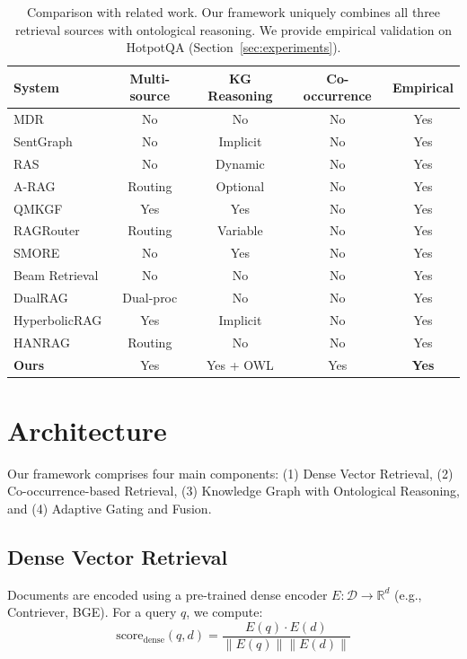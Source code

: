 \documentclass[11pt,a4paper]{article}
\begin{document}
\begin{table}[h]
\centering
\small
\begin{tabular}{lcccc}
\toprule
\textbf{System} & \textbf{Multi-source} & \textbf{KG Reasoning} & \textbf{Co-occurrence} & \textbf{Empirical} \\
\midrule
MDR & No & No & No & Yes \\
SentGraph & No & Implicit & No & Yes \\
RAS & No & Dynamic & No & Yes \\
A-RAG & Routing & Optional & No & Yes \\
QMKGF & Yes & Yes & No & Yes \\
RAGRouter & Routing & Variable & No & Yes \\
SMORE & No & Yes & No & Yes \\
Beam Retrieval & No & No & No & Yes \\
DualRAG & Dual-proc & No & No & Yes \\
HyperbolicRAG & Yes & Implicit & No & Yes \\
HANRAG & Routing & No & No & Yes \\
\midrule
\textbf{Ours} & Yes & Yes + OWL & Yes & \textbf{Yes} \\
\bottomrule
\end{tabular}
\caption{Comparison with related work. Our framework uniquely combines all three retrieval sources with ontological reasoning. We provide empirical validation on HotpotQA (Section~\ref{sec:experiments}).}
\label{tab:related_work}
\end{table}

\section{Architecture}
\label{sec:architecture}

Our framework comprises four main components: (1) Dense Vector Retrieval, (2) Co-occurrence-based Retrieval, (3) Knowledge Graph with Ontological Reasoning, and (4) Adaptive Gating and Fusion.

\subsection{Dense Vector Retrieval}
\label{sec:dense_retrieval}

Documents are encoded using a pre-trained dense encoder $E: \mathcal{D} \rightarrow \mathbb{R}^d$ (e.g., Contriever, BGE). For a query $q$, we compute:
\begin{equation}
\text{score}_{\text{dense}}(q, d) = \frac{E(q) \cdot E(d)}{\|E(q)\| \|E(d)\|}
\end{equation}
\end{document}
